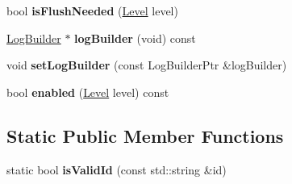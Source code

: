 \begin{DoxyCompactItemize}
\item 
bool {\bfseries is\+Flush\+Needed} (\hyperlink{namespaceel_ab0ac6091262344c52dd2d3ad099e8e36}{Level} level)\hypertarget{classel_1_1Logger_abdf56c00388c71d1cbaa7e2df4449202}{}\label{classel_1_1Logger_abdf56c00388c71d1cbaa7e2df4449202}

\item 
\hyperlink{classel_1_1LogBuilder}{Log\+Builder} $\ast$ {\bfseries log\+Builder} (void) const \hypertarget{classel_1_1Logger_aead5b130c5141d2024740b03ab4b45d7}{}\label{classel_1_1Logger_aead5b130c5141d2024740b03ab4b45d7}

\item 
void {\bfseries set\+Log\+Builder} (const Log\+Builder\+Ptr \&log\+Builder)\hypertarget{classel_1_1Logger_a737340322cc9d9d20febd7131c1e262f}{}\label{classel_1_1Logger_a737340322cc9d9d20febd7131c1e262f}

\item 
bool {\bfseries enabled} (\hyperlink{namespaceel_ab0ac6091262344c52dd2d3ad099e8e36}{Level} level) const \hypertarget{classel_1_1Logger_a5abaca24ac28bfd4806bea32be193435}{}\label{classel_1_1Logger_a5abaca24ac28bfd4806bea32be193435}

\end{DoxyCompactItemize}
\subsection*{Static Public Member Functions}
\begin{DoxyCompactItemize}
\item 
static bool {\bfseries is\+Valid\+Id} (const std\+::string \&id)\hypertarget{classel_1_1Logger_af6cf4f266ceb65da9563afd3706f26d6}{}\label{classel_1_1Logger_af6cf4f266ceb65da9563afd3706f26d6}

\end{DoxyCompactItemize}
